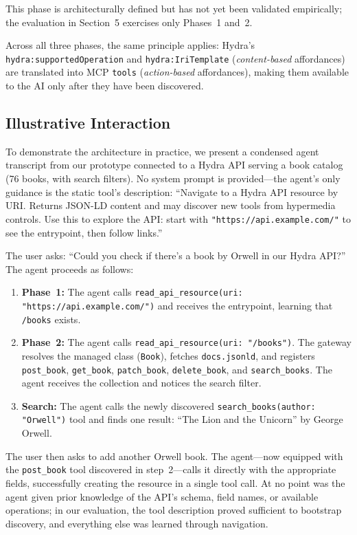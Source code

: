 \documentclass[11pt,a4paper]{article}
\begin{document}
This phase is architecturally defined but has not yet been validated empirically; the evaluation in Section~5 exercises only Phases~1 and~2.

\medskip

Across all three phases, the same principle applies: Hydra's \texttt{hydra:supportedOperation} and \texttt{hydra:IriTemplate} (\emph{content-based} affordances) are translated into MCP \texttt{tools} (\emph{action-based} affordances), making them available to the AI only after they have been discovered.

\subsection{Illustrative Interaction}

To demonstrate the architecture in practice, we present a condensed agent transcript from our prototype connected to a Hydra API serving a book catalog (76 books, with search filters). No system prompt is provided---the agent's only guidance is the static tool's description: ``Navigate to a Hydra API resource by URI. Returns JSON-LD content and may discover new tools from hypermedia controls. Use this to explore the API: start with \texttt{"https://api.example.com/"} to see the entrypoint, then follow links.''

The user asks: ``Could you check if there's a book by Orwell in our Hydra API?'' The agent proceeds as follows:

\begin{enumerate}
  \item \textbf{Phase~1:} The agent calls \texttt{read\_api\_resource(uri: "https://api.example.com/")} and receives the entrypoint, learning that \texttt{/books} exists.
  \item \textbf{Phase~2:} The agent calls \texttt{read\_api\_resource(uri: "/books")}. The gateway resolves the managed class (\texttt{Book}), fetches \texttt{docs.jsonld}, and registers \texttt{post\_book}, \texttt{get\_book}, \texttt{patch\_book}, \texttt{delete\_book}, and \texttt{search\_books}. The agent receives the collection and notices the search filter.
  \item \textbf{Search:} The agent calls the newly discovered \texttt{search\_books(author: "Orwell")} tool and finds one result: ``The Lion and the Unicorn'' by George Orwell.
\end{enumerate}

The user then asks to add another Orwell book. The agent---now equipped with the \texttt{post\_book} tool discovered in step~2---calls it directly with the appropriate fields, successfully creating the resource in a single tool call. At no point was the agent given prior knowledge of the API's schema, field names, or available operations; in our evaluation, the tool description proved sufficient to bootstrap discovery, and everything else was learned through navigation.
\end{document}
